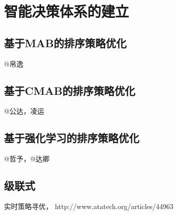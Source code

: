 
\chapter{ 智能决策体系的建立 }
\thispagestyle{empty}

\setlength{\fboxrule}{0pt}\setlength{\fboxsep}{0cm}
\noindent\shadowbox{
\begin{tcolorbox}[arc=0mm,colback=lightblue,colframe=darkblue,title=学习目标与要求]

\end{tcolorbox}}
\setlength{\fboxrule}{1pt}\setlength{\fboxsep}{4pt} 
		
\section{ 基于MAB的排序策略优化 } 
	@帛逸

\section{ 基于CMAB的排序策略优化 } 
	@公达，凌运

\section{ 基于强化学习的排序策略优化 } 
	@哲予，@达卿

\section{ 级联式 }


\begin{thebibliography}{99}
 实时策略寻优， http://www.atatech.org/articles/44963

\end{thebibliography}

 
